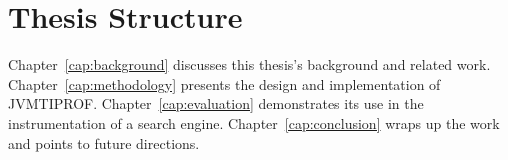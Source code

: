 \section{Thesis Structure}

Chapter~\ref{cap:background} discusses this thesis's background and related work. Chapter~\ref{cap:methodology} presents the design and implementation of JVMTIPROF. Chapter~\ref{cap:evaluation} demonstrates its use in the instrumentation of a search engine. Chapter~\ref{cap:conclusion} wraps up the work and points to future directions.

